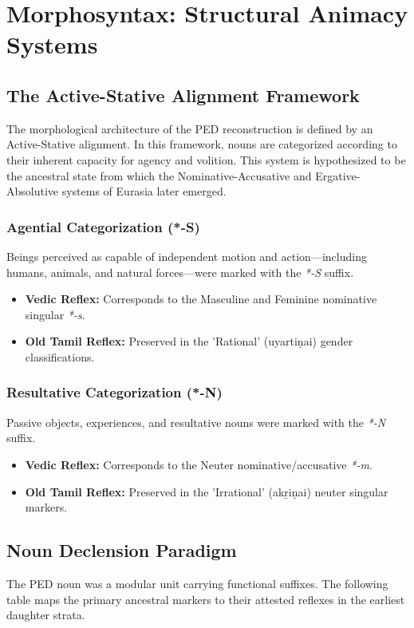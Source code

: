 \chapter{Morphosyntax: Structural Animacy Systems}

\section{The Active-Stative Alignment Framework}
The morphological architecture of the PED reconstruction is defined by an Active-Stative alignment. In this framework, nouns are categorized according to their inherent capacity for agency and volition. This system is hypothesized to be the ancestral state from which the Nominative-Accusative and Ergative-Absolutive systems of Eurasia later emerged.

\subsection{Agential Categorization (*-S)}
Beings perceived as capable of independent motion and action—including humans, animals, and natural forces—were marked with the \textit{*-S} suffix. 
\begin{itemize}
    \item \textbf{Vedic Reflex:} Corresponds to the Masculine and Feminine nominative singular \textit{*-s}.
    \item \textbf{Old Tamil Reflex:} Preserved in the 'Rational' (uyartiṇai) gender classifications.
\end{itemize}

\subsection{Resultative Categorization (*-N)}
Passive objects, experiences, and resultative nouns were marked with the \textit{*-N} suffix.
\begin{itemize}
    \item \textbf{Vedic Reflex:} Corresponds to the Neuter nominative/accusative \textit{*-m}.
    \item \textbf{Old Tamil Reflex:} Preserved in the 'Irrational' (akṟiṇai) neuter singular markers.
\end{itemize}

\section{Noun Declension Paradigm}
The PED noun was a modular unit carrying functional suffixes. The following table maps the primary ancestral markers to their attested reflexes in the earliest daughter strata.


